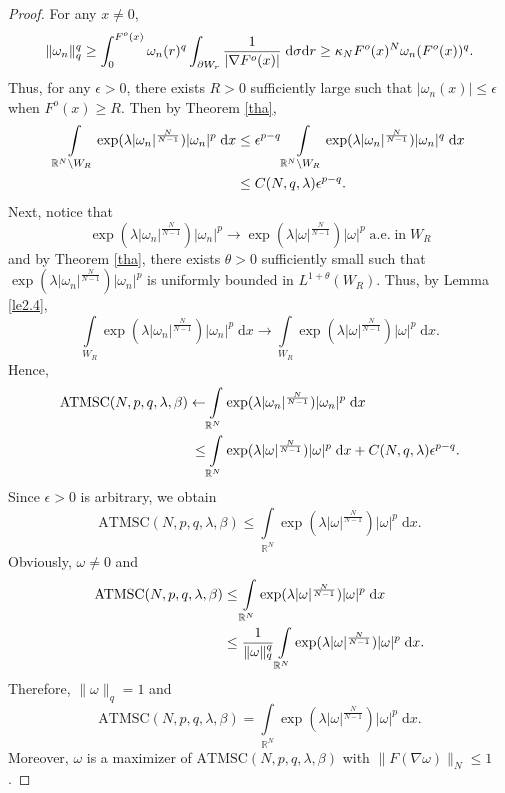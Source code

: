 \documentclass[10pt,a4paper]{amsart}
\newcommand{\R}{\mathbb{R}}
\begin{document}
\begin{proof}
For any $x\not=0$,
\begin{align}
    \|\omega_{n}\|_{q}^{q}\geq\int_{0}^{F^{o}(x)}\omega_{n}(r)^{q}\int_{\partial W_{r}}\frac{1}{\lvert\nabla F^{o}(x)\rvert}\;\mathrm{d}\sigma\mathrm{d}r\geq\kappa_{N}F^{o}(x)^{N}\omega_{n}(F^{o}(x))^{q}.\notag
\end{align}
Thus, for any $\epsilon>0$, there exists $R>0$ sufficiently large such that $\lvert\omega_{n}(x)\rvert\leq\epsilon$ when $F^{o}(x)\geq R$. Then by Theorem \ref{tha},
\begin{align}
    \int\limits_{\R^{N}\backslash W_{R}}\exp(\lambda\lvert \omega_{n}\rvert^{\frac{N}{N-1}})\lvert \omega_{n}\rvert^{p}\;\mathrm{d}x&\leq\epsilon^{p-q}\int\limits_{\R^{N}\backslash W_{R}}\exp(\lambda\lvert \omega_{n}\rvert^{\frac{N}{N-1}})\lvert \omega_{n}\rvert^{q}\;\mathrm{d}x\notag\\
    &\leq C(N,q,\lambda)\epsilon^{p-q}.\notag
\end{align}
Next, notice that
$$
\exp(\lambda\lvert \omega_{n}\rvert^{\frac{N}{N-1}})\lvert \omega_{n}\rvert^{p}\rightarrow\exp(\lambda\lvert \omega\rvert^{\frac{N}{N-1}})\lvert \omega\rvert^{p}\;\mathrm{a.e.}\;\mathrm{in}\;W_{R}
$$
and by Theorem \ref{tha}, there exists $\theta>0$ sufficiently small such that $\exp(\lambda\lvert \omega_{n}\rvert^{\frac{N}{N-1}})\lvert \omega_{n}\rvert^{p}$ is uniformly bounded in $L^{1+\theta}(W_{R})$. Thus, by Lemma \ref{le2.4},
$$
\int\limits_{W_{R}}\exp(\lambda\lvert \omega_{n}\rvert^{\frac{N}{N-1}})\lvert \omega_{n}\rvert^{p}\;\mathrm{d}x\rightarrow\int\limits_{W_{R}}\exp(\lambda\lvert \omega\rvert^{\frac{N}{N-1}})\lvert \omega\rvert^{p}\;\mathrm{d}x.
$$
Hence,
\begin{align}
    \mathrm{ATMSC}(N,p,q,\lambda,\beta)\leftarrow&\int\limits_{\R^{N}}\exp(\lambda\lvert \omega_{n}\rvert^{\frac{N}{N-1}})\lvert \omega_{n}\rvert^{p}\;\mathrm{d}x\notag\\
    \leq&\int\limits_{\R^{N}}\exp(\lambda\lvert \omega\rvert^{\frac{N}{N-1}})\lvert \omega\rvert^{p}\;\mathrm{d}x+C(N,q,\lambda)\epsilon^{p-q}.\notag
\end{align}
Since $\epsilon>0$ is arbitrary, we obtain
$$
\mathrm{ATMSC}(N,p,q,\lambda,\beta)\leq\int\limits_{\R^{N}}\exp(\lambda\lvert \omega\rvert^{\frac{N}{N-1}})\lvert \omega\rvert^{p}\;\mathrm{d}x.
$$
Obviously, $\omega\not=0$ and
\begin{align}
    \mathrm{ATMSC}(N,p,q,\lambda,\beta)&\leq\int\limits_{\R^{N}}\exp(\lambda\lvert \omega\rvert^{\frac{N}{N-1}})\lvert \omega\rvert^{p}\;\mathrm{d}x\notag\\
    &\leq\frac{1}{\|\omega\|_{q}^{q}}\int\limits_{\R^{N}}\exp(\lambda\lvert \omega\rvert^{\frac{N}{N-1}})\lvert \omega\rvert^{p}\;\mathrm{d}x.\notag
\end{align}
Therefore, $\|\omega\|_{q}=1$ and
$$
\mathrm{ATMSC}(N,p,q,\lambda,\beta)=\int\limits_{\R^{N}}\exp(\lambda\lvert \omega\rvert^{\frac{N}{N-1}})\lvert \omega\rvert^{p}\;\mathrm{d}x.
$$
Moreover, $\omega$ is a maximizer of $\mathrm{ATMSC}(N,p,q,\lambda,\beta)$ with $\|F(\nabla\omega)\|_{N}\leq1$.


\end{proof}
\end{document}
